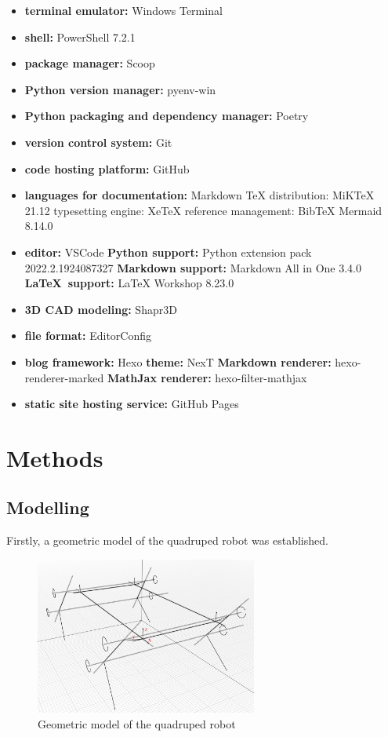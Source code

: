 \begin{itemize}
   \item \textbf{terminal emulator:} Windows Terminal
   \item \textbf{shell:} PowerShell 7.2.1
   \item \textbf{package manager:} Scoop
   \item \textbf{Python version manager:} pyenv-win
   \item \textbf{Python packaging and dependency manager:} Poetry
   \item \textbf{version control system:} Git
   \item \textbf{code hosting platform:} GitHub
   \item \textbf{languages for documentation:}
      \subitem Markdown
      \subitem \LaTeXe
         \subsubitem TeX distribution: MiKTeX 21.12
         \subsubitem typesetting engine: XeTeX
         \subsubitem reference management: BibTeX
      \subitem Mermaid 8.14.0
   \item \textbf{editor:} VSCode
      \subitem \textbf{Python support:} Python extension pack 2022.2.1924087327
      \subitem \textbf{Markdown support:} Markdown All in One 3.4.0
      \subitem \textbf{\LaTeX\ support:} LaTeX Workshop 8.23.0
   \item \textbf{3D CAD modeling:} Shapr3D
   \item \textbf{file format:} EditorConfig
   \item \textbf{blog framework:} Hexo
      \subitem \textbf{theme:} NexT
      \subitem \textbf{Markdown renderer:} hexo-renderer-marked
      \subitem \textbf{MathJax renderer:} hexo-filter-mathjax
   \item \textbf{static site hosting service:} GitHub Pages
\end{itemize}

\newpage
\section{Methods}

\subsection{Modelling}

Firstly, a geometric model of the quadruped robot was established.

\begin{figure}[htbp]\label{fig:geometric_model}
   \centering
   \includegraphics[width=0.65\textwidth]{figures/geometric_model.jpg}
   \caption{Geometric model of the quadruped robot}
\end{figure}

